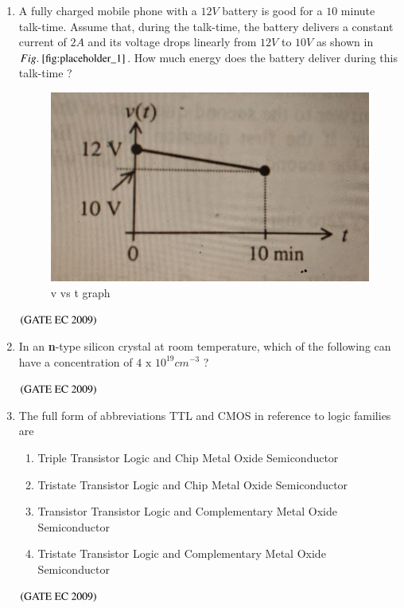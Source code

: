 \documentclass[journal,12pt,onecolumn]{IEEEtran}
\theoremstyle{remark}
\begin{document}
\begin{enumerate}
\item A fully charged mobile phone with a $12V$ battery is good for a $10$ minute talk-time. Assume that, during the talk-time, the battery delivers a constant current of $2A$ and its voltage drops linearly from $12V$ to $10V$ as shown in $\figref{fig:placeholder_1}$. How much energy does the battery deliver during this talk-time ?
\begin{figure}
    \centering
    \includegraphics[width=0.5\columnwidth]{figs/fig_1.jpg}
    \caption{\centering v vs t graph}
    \label{fig:placeholder_1}
\end{figure}
\begin{enumerate}
\end{enumerate}
\hfill $\brak{\text{GATE EC 2009}}$

\item In an \textbf{n}-type silicon crystal at room temperature, which of the following can have a concentration of $4 \text{ x } 10^{19}  cm^{-3}$ ?
\begin{enumerate}
\end{enumerate}
\hfill $\brak{\text{GATE EC 2009}}$

\item The full form of abbreviations TTL and CMOS in reference to logic families are 
\begin{enumerate}
\item Triple Transistor Logic and Chip Metal Oxide Semiconductor
\item Tristate Transistor Logic and Chip Metal Oxide Semiconductor
\item Transistor Transistor Logic and Complementary Metal Oxide Semiconductor
\item Tristate Transistor Logic and Complementary Metal Oxide Semiconductor
\end{enumerate}
\hfill $\brak{\text{GATE EC 2009}}$


\end{enumerate}
\end{document}
